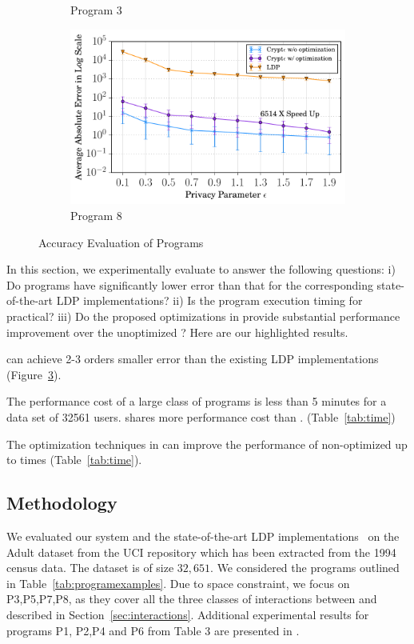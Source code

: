 \begin{figure}
\begin{subfigure}[b]{0.25\linewidth}
        \caption{Program 3}
        \label{fig:P7}
    \end{subfigure}%
    \begin{subfigure}[b]{0.25\linewidth}
        \centering
         \includegraphics[width=1\linewidth]{t1_final.pdf}
        \caption{ Program 8 }
        \label{fig:P1}
    \end{subfigure}%
     \caption{Accuracy Evaluation of \system Programs}\label{fig:accuracy}
\end{figure}

In this section, we experimentally evaluate \system to answer the following questions: i) Do \system programs have significantly lower error than that for the corresponding state-of-the-art LDP implementations? ii) Is the program execution timing for \system practical? iii) Do the proposed optimizations in \system provide substantial performance improvement over the unoptimized \system? Here are our highlighted results.
\squishlist
\item \system can achieve 2-3 orders smaller error than the existing LDP implementations (Figure~\ref{fig:accuracy}).
\item The performance cost of a large class of \system programs is less than 5 minutes for a data set of 32561 users. \AS shares more performance cost than \CPS.  (Table~\ref{tab:time})
\item The optimization techniques in \system can improve the performance of non-optimized \system up to  times (Table~\ref{tab:time}).
\squishend

\subsection{Methodology} \label{sec:methodology}
 We evaluated our system and the state-of-the-art LDP implementations~\cite{LDP1} on the Adult dataset from the UCI repository \cite{UCI}  which has been extracted from the 1994 census data. The dataset is of size $32,651$. We considered the programs outlined in Table~\ref{tab:programexamples}. Due to space constraint, we focus on P3,P5,P7,P8, as they  cover all the three classes of interactions between \AS and \CPS described in Section~\ref{sec:interactions}.  Additional experimental results for programs P1, P2,P4 and P6 from Table 3 are presented in .

